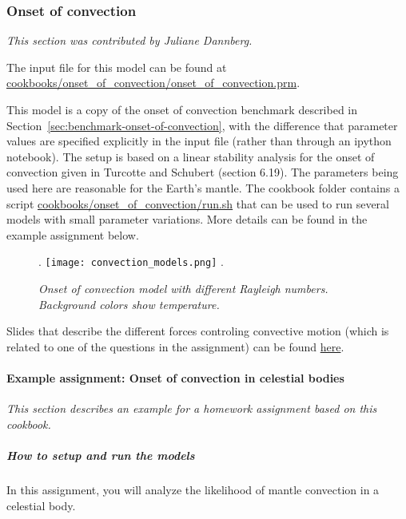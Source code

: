 \subsubsection{Onset of convection}
\label{sec:cookbooks-onset-of-convection}
\textit{This section was contributed by Juliane Dannberg.}

The input file for this model can be found at \url{cookbooks/onset_of_convection/onset_of_convection.prm}.

This model is a copy of the onset of convection benchmark described in Section~\ref{sec:benchmark-onset-of-convection}, 
with the difference that parameter values are specified explicitly in the input file (rather than through an ipython notebook). 
The setup is based on a linear stability analysis for the onset of convection given in Turcotte and Schubert \cite{TS14} (section 6.19).
The parameters being used here are reasonable for the Earth's mantle. The cookbook folder contains a script 
\url{cookbooks/onset_of_convection/run.sh} that can be used to run several models with small parameter variations.
More details can be found in the example assignment below. 

\begin{figure}[h]
\phantom.
\hfill
\texttt{[image: convection\_models.png]}
\hfill
\phantom.
\caption{\it Onset of convection model with different Rayleigh numbers. Background colors show temperature.}
\label{fig:convection-box-iterations}
\end{figure}

Slides that describe the different forces controling convective motion (which is related to one of the questions
in the assignment) can be found \href{https://www.dropbox.com/s/0wqtg05w7713hdz/06_geophysics_lecture_01_29.pdf?dl=0}{here}.

\paragraph{Example assignment: Onset of convection in celestial bodies}
\textit{This section describes an example for a homework assignment based on this cookbook.}

\subparagraph{How to setup and run the models}

In this assignment, you will analyze the likelihood of mantle convection in a celestial body.

